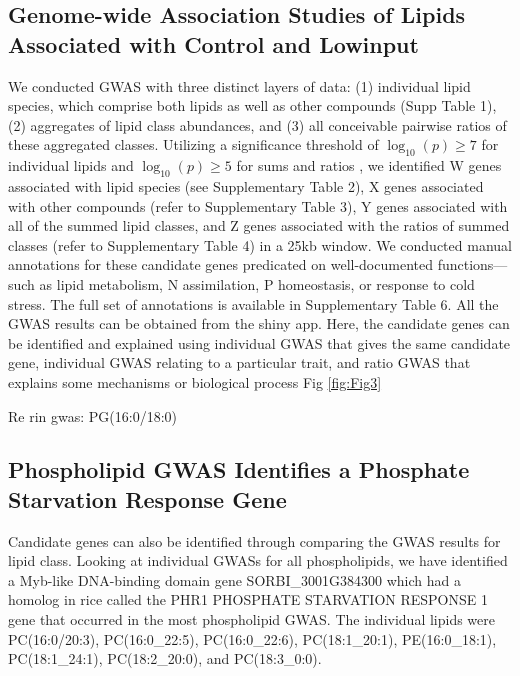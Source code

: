 \documentclass[10pt,letterpaper]{article}
\begin{document}
\subsection*{Genome-wide Association Studies of Lipids Associated with Control and Lowinput}
We conducted GWAS with three distinct layers of data: (1) individual lipid species, which comprise both lipids  as well as other compounds (Supp Table 1), (2) aggregates of lipid class abundances, and (3) all conceivable pairwise ratios of these aggregated classes. Utilizing a significance threshold of $\log_{10}(p)\ge7$ for individual lipids and $\log_{10}(p)\ge5$ for sums and ratios , we identified W genes associated with lipid species (see Supplementary Table 2), X genes associated with other compounds (refer to Supplementary Table 3), Y genes associated with all of the summed lipid classes, and Z genes associated with the ratios of summed classes (refer to Supplementary Table 4) in a 25kb window. We conducted manual annotations for these candidate genes predicated on well-documented functions—such as lipid metabolism, N assimilation, P homeostasis, or response to cold stress. The full set of annotations is available in Supplementary Table 6. All the GWAS results can be obtained from the shiny app. Here, the candidate genes can be identified and explained using individual GWAS that gives the same candidate gene, individual GWAS relating to a particular trait, and ratio GWAS that explains some mechanisms or biological process Fig \ref{fig:Fig3}


Re rin gwas:
PG(16:0/18:0)

\subsection*{Phospholipid GWAS Identifies a Phosphate Starvation Response Gene}
Candidate genes can also be identified through comparing the GWAS results for lipid class. Looking at individual GWASs for all phospholipids, we have identified a Myb-like DNA-binding domain gene SORBI_3001G384300 which had a homolog in rice called the PHR1 PHOSPHATE STARVATION RESPONSE 1 gene that occurred in the most phospholipid GWAS. The individual lipids were PC(16:0/20:3), PC(16:0_22:5), PC(16:0_22:6), PC(18:1_20:1), PE(16:0_18:1), PC(18:1_24:1), PC(18:2_20:0), and PC(18:3_0:0).
\end{document}
